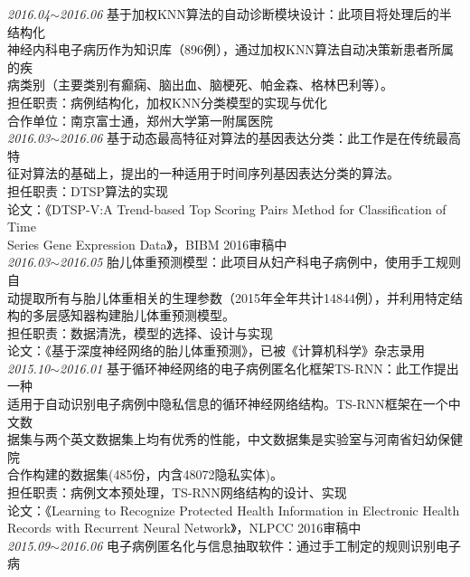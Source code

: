 \documentclass[line, margin]{res}
\newcommand{\xiaowu}{\fontsize{9pt}{15.75pt}\selectfont} %
\begin{document}
\begin{resume}
 { 
 {\sl 2016.04$\sim$2016.06} 基于加权KNN算法的自动诊断模块设计：{ 此项目将处理后的半结构化\\
 神经内科电子病历作为知识库（896例），通过加权KNN算法自动决策新患者所属的疾\\
 病类别（主要类别有癫痫、脑出血、脑梗死、帕金森、格林巴利等）。\\
 {\xiaowu 担任职责：病例结构化，加权KNN分类模型的实现与优化}\\
 {\xiaowu 合作单位：南京富士通，郑州大学第一附属医院} }\\
[9pt] 
 {\sl 2016.03$\sim$2016.06} 基于动态最高特征对算法的基因表达分类：{ 此工作是在传统最高特\\
 征对算法的基础上，提出的一种适用于时间序列基因表达分类的算法。}\\
 {\xiaowu 担任职责：DTSP算法的实现}\\
 {\xiaowu 论文：《DTSP-V:A Trend-based Top Scoring Pairs Method for Classification of Time\\
  Series Gene Expression Data》，BIBM 2016审稿中}\\
[9pt] 
 {\sl 2016.03$\sim$2016.05} 胎儿体重预测模型：{ 此项目从妇产科电子病例中，使用手工规则自\\
 动提取所有与胎儿体重相关的生理参数（2015年全年共计14844例），并利用特定结\\
 构的多层感知器构建胎儿体重预测模型。} \\
 {\xiaowu 担任职责：数据清洗，模型的选择、设计与实现}\\
 {\xiaowu 论文：《基于深度神经网络的胎儿体重预测》，已被《计算机科学》杂志录用} \\
[9pt]
 {\sl 2015.10$\sim$2016.01} 基于循环神经网络的电子病例匿名化框架TS-RNN：{ 此工作提出一种\\
 适用于自动识别电子病例中隐私信息的循环神经网络结构。TS-RNN框架在一个中文数\\
 据集与两个英文数据集上均有优秀的性能，中文数据集是实验室与河南省妇幼保健院\\
 合作构建的数据集(485份，内含48072隐私实体)。} \\
 {\xiaowu 担任职责：病例文本预处理，TS-RNN网络结构的设计、实现}\\
 {\xiaowu 论文：《Learning to Recognize Protected Health Information in  Electronic Health\\
 Records with Recurrent Neural Network》，NLPCC 2016审稿中}\\
[9pt] 
 {\sl 2015.09$\sim$2016.06} 电子病例匿名化与信息抽取软件：{ 通过手工制定的规则识别电子病\\
}}
\end{resume}
\end{document}
